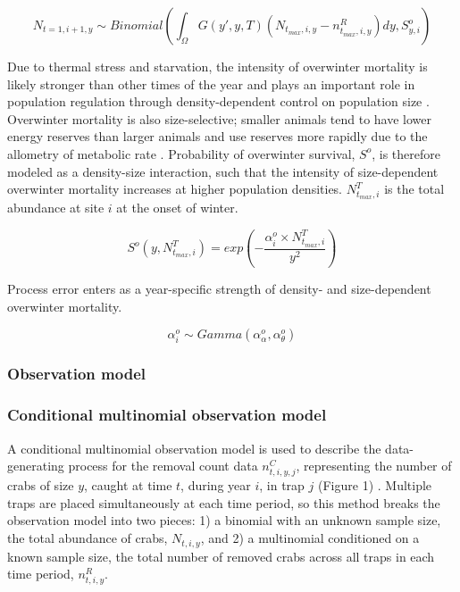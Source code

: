 \documentclass{article}
\begin{document}
\begin{equation}
N_{t=1,i+1,y} \sim Binomial( \int_{\Omega} G(y',y, T) (N_{t_{max},i,y} - n^R_{t_{max},i,y}) dy,  S^o_{y,i})
\end{equation}

Due to thermal stress and starvation, the intensity of overwinter mortality is likely stronger than other times of the year and plays an important role in population regulation through density-dependent control on population size \parencite{henderson1988size}. Overwinter mortality is also size-selective; smaller animals tend to have lower energy reserves than larger animals and use reserves more rapidly due to the allometry of metabolic rate \parencite{hurst2007causes}. Probability of overwinter survival, $S^o$, is therefore modeled as a density-size interaction, such that the intensity of size-dependent overwinter mortality increases at higher population densities. $N^T_{t_{max},i}$ is the total abundance at site $i$ at the onset of winter.

\begin{equation}
S^o(y,N^T_{t_{max},i}) = exp(-\frac{\alpha_i^o \times N^T_{t_{max},i}}{y^2})
\end{equation}

Process error enters as a year-specific strength of density- and size-dependent overwinter mortality.

\begin{equation}
\alpha^o_i \sim Gamma(\alpha^o_{\alpha}, \alpha^o_{\theta})
\end{equation}

\subsubsection{Observation model}

\subsubsection*{Conditional multinomial observation model}

A conditional multinomial observation model is used to describe the data-generating process for the removal count data $n^C_{t,i,y,j}$, representing the number of crabs of size $y$, caught at time $t$, during year $i$, in trap $j$ (Figure 1) \parencite{kery2015modeling}. Multiple traps are placed simultaneously at each time period, so this method breaks the observation model into two pieces: 1) a binomial with an unknown sample size, the total abundance of crabs, $N_{t,i,y}$, and 2) a multinomial conditioned on a known sample size, the total number of removed crabs across all traps in each time period, $n^R_{t,i,y}$.
\end{document}
